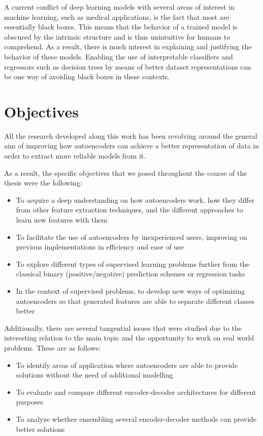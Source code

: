 
A current conflict of deep learning models with several areas of interest in machine learning, such as medical applications, is the fact that most are essentially black boxes. This means that the behavior of a trained model is obscured by the intrinsic structure and is thus unintuitive for humans to comprehend. As a result, there is much interest in explaining and justifying the behavior of these models. Enabling the use of interpretable classifiers and regressors such as decision trees by means of better dataset representations can be one way of avoiding black boxes in these contexts.

\section{Objectives}

All the research developed along this work has been revolving around the general aim of improving how autoencoders can achieve a better representation of data in order to extract more reliable models from it. 

As a result, the specific objectives that we posed throughout the course of the thesis were the following:

\begin{itemize}
    \item To acquire a deep understanding on how autoencoders work, how they differ from other feature extraction techniques, and the different approaches to learn new features with them
    \item To facilitate the use of autoencoders by inexperienced users, improving on previous implementations in efficiency and ease of use
    \item To explore different types of supervised learning problems further from the classical binary (positive/negative) prediction schemes or regression tasks
    \item In the context of supervised problems, to develop new ways of optimizing autoencoders so that generated features are able to separate different classes better
\end{itemize}

Additionally, there are several tangential issues that were studied due to the interesting relation to the main topic and the opportunity to work on real world problems. These are as follows:

\begin{itemize}
    \item To identify areas of application where autoencoders are able to provide solutions without the need of additional modelling
    \item To evaluate and compare different encoder-decoder architectures for different purposes 
    \item To analyze whether ensembling several encoder-decoder methods can provide better solutions
\end{itemize}

